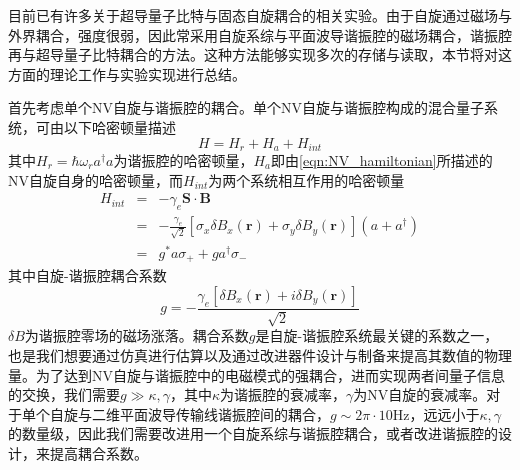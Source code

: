             目前已有许多关于超导量子比特与固态自旋耦合的相关实验。由于自旋通过磁场与外界耦合，强度很弱，因此常采用自旋系综与平面波导谐振腔的磁场耦合，谐振腔再与超导量子比特耦合的方法\cite{grezes2016towards}。这种方法能够实现多次的存储与读取，本节将对这方面的理论工作与实验实现进行总结。

            首先考虑单个NV自旋与谐振腔的耦合。单个NV自旋与谐振腔构成的混合量子系统，可由以下哈密顿量描述
            \begin{equation}
            \label{eqn:Hamiltonian_resonator_NV}
                H = H_r + H_a + H_{int}
            \end{equation}
            其中$H_r = \hbar \omega_r a^\dagger a $为谐振腔的哈密顿量，$H_a$即由\ref{eqn:NV_hamiltonian}所描述的NV自旋自身的哈密顿量，而$H_{int}$为两个系统相互作用的哈密顿量\cite{grezes2016towards}
            \begin{eqnarray}
                H_{int} &=& - \gamma_e \bm S \cdot \bm B\\
                        &=& - \frac{\gamma_e}{\sqrt 2} [ \sigma_x \delta B_x (\bm r) + \sigma_y \delta B_y (\bm r) ](a + a^\dagger) \\
                        &=& g^* a \sigma_+ + g a^\dagger \sigma_-
            \end{eqnarray}
            其中自旋-谐振腔耦合系数
            \begin{equation}
            \label{eqn:coupling_coeff}
                g = - \frac{\gamma_e [ \delta B_x(\bm r) + i \delta B_y(\bm r) ] }{\sqrt 2}
            \end{equation}
            $\delta B $为谐振腔零场的磁场涨落。耦合系数$g$是自旋-谐振腔系统最关键的系数之一，也是我们想要通过仿真进行估算以及通过改进器件设计与制备来提高其数值的物理量。为了达到NV自旋与谐振腔中的电磁模式的强耦合，进而实现两者间量子信息的交换，我们需要$ g\gg \kappa, \gamma $，其中$ \kappa $为谐振腔的衰减率，$\gamma $为NV自旋的衰减率。对于单个自旋与二维平面波导传输线谐振腔间的耦合，$g\sim 2\pi\cdot 10 $Hz\cite{grezes2016towards}，远远小于$\kappa, \gamma $的数量级，因此我们需要改进用一个自旋系综与谐振腔耦合，或者改进谐振腔的设计，来提高耦合系数。

